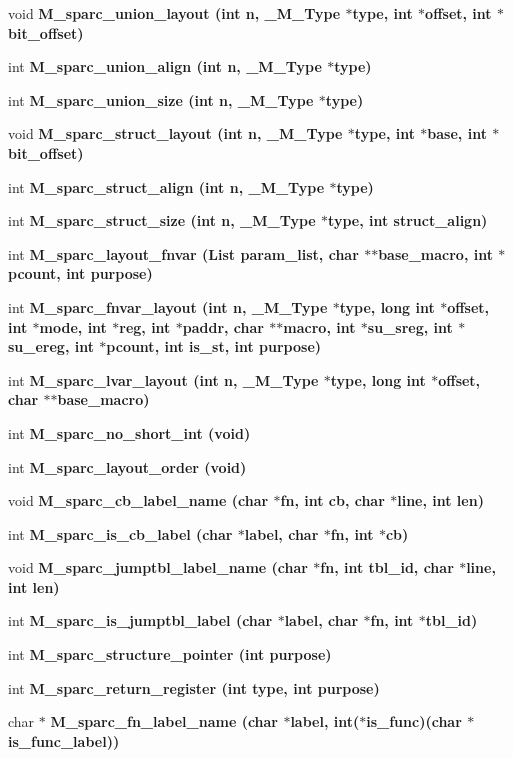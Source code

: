 \begin{CompactItemize}
\item 
void \bf{M\_\-sparc\_\-union\_\-layout} (int n, \bf{\_\-M\_\-Type} $\ast$type, int $\ast$offset, int $\ast$bit\_\-offset)
\item 
int \bf{M\_\-sparc\_\-union\_\-align} (int n, \bf{\_\-M\_\-Type} $\ast$type)
\item 
int \bf{M\_\-sparc\_\-union\_\-size} (int n, \bf{\_\-M\_\-Type} $\ast$type)
\item 
void \bf{M\_\-sparc\_\-struct\_\-layout} (int n, \bf{\_\-M\_\-Type} $\ast$type, int $\ast$base, int $\ast$bit\_\-offset)
\item 
int \bf{M\_\-sparc\_\-struct\_\-align} (int n, \bf{\_\-M\_\-Type} $\ast$type)
\item 
int \bf{M\_\-sparc\_\-struct\_\-size} (int n, \bf{\_\-M\_\-Type} $\ast$type, int struct\_\-align)
\item 
int \bf{M\_\-sparc\_\-layout\_\-fnvar} (\bf{List} param\_\-list, char $\ast$$\ast$base\_\-macro, int $\ast$pcount, int purpose)
\item 
int \bf{M\_\-sparc\_\-fnvar\_\-layout} (int n, \bf{\_\-M\_\-Type} $\ast$type, long int $\ast$offset, int $\ast$\bf{mode}, int $\ast$reg, int $\ast$paddr, char $\ast$$\ast$macro, int $\ast$su\_\-sreg, int $\ast$su\_\-ereg, int $\ast$pcount, int is\_\-st, int purpose)
\item 
int \bf{M\_\-sparc\_\-lvar\_\-layout} (int n, \bf{\_\-M\_\-Type} $\ast$type, long int $\ast$offset, char $\ast$$\ast$base\_\-macro)
\item 
int \bf{M\_\-sparc\_\-no\_\-short\_\-int} (void)
\item 
int \bf{M\_\-sparc\_\-layout\_\-order} (void)
\item 
void \bf{M\_\-sparc\_\-cb\_\-label\_\-name} (char $\ast$fn, int cb, char $\ast$line, int len)
\item 
int \bf{M\_\-sparc\_\-is\_\-cb\_\-label} (char $\ast$label, char $\ast$fn, int $\ast$cb)
\item 
void \bf{M\_\-sparc\_\-jumptbl\_\-label\_\-name} (char $\ast$fn, int tbl\_\-id, char $\ast$line, int len)
\item 
int \bf{M\_\-sparc\_\-is\_\-jumptbl\_\-label} (char $\ast$label, char $\ast$fn, int $\ast$tbl\_\-id)
\item 
int \bf{M\_\-sparc\_\-structure\_\-pointer} (int purpose)
\item 
int \bf{M\_\-sparc\_\-return\_\-register} (int type, int purpose)
\item 
char $\ast$ \bf{M\_\-sparc\_\-fn\_\-label\_\-name} (char $\ast$label, int($\ast$is\_\-func)(char $\ast$is\_\-func\_\-label))
$$
\end{CompactItemize}
